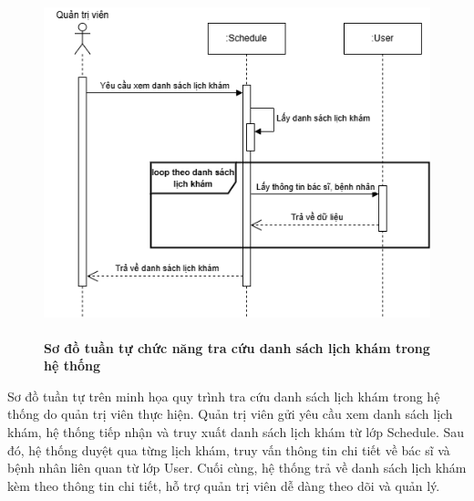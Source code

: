\begin{figure}[H]
	\centering
	\includegraphics[width=12cm,height=10cm]{Images/sequence/schedule/getAll.drawio.png}
	\caption[Sơ đồ tuần tự chức năng tra cứu danh sách lịch khám trong hệ thống]{\bfseries \fontsize{12pt}{0pt}
		\selectfont Sơ đồ tuần tự chức năng tra cứu danh sách lịch khám trong hệ thống}
	\label{sequence_get_all} %
\end{figure}
Sơ đồ tuần tự trên minh họa quy trình tra cứu danh sách lịch khám trong hệ thống do quản trị viên thực hiện. Quản trị viên gửi yêu cầu xem danh sách lịch khám, hệ thống tiếp nhận và truy xuất danh sách lịch khám từ lớp Schedule.
Sau đó, hệ thống duyệt qua từng lịch khám, truy vấn thông tin chi tiết về bác sĩ và bệnh nhân liên quan từ lớp User. Cuối cùng, hệ thống trả về danh sách lịch khám kèm theo thông tin chi tiết, hỗ trợ quản trị viên dễ dàng theo dõi và quản lý.

